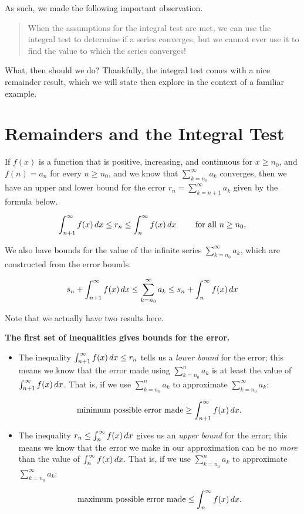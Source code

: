 \documentclass{ximera}
\begin{document}
As such, we made the following important observation. 
  
\begin{quote}
When the assumptions for the integral test are met, we can use the integral test to determine if a series converges, but we cannot ever use it to find the value to which the series converges!
\end{quote}

What, then should we do?  Thankfully, the integral test comes with a nice remainder result, which we will state then explore in the context of a familiar example.



\section{Remainders and the Integral Test}

\begin{theorem}
If $f(x)$ is a function that is positive, increasing, and continuous for $x \geq n_0$,  and $f(n) = a_n$ for every $n \geq n_0$, and we know that $\sum_{k=n_0}^\infty a_k$ converges, then we have an upper and lower bound for the error $r_n=\sum_{k=n+1}^{\infty} a_k$ given by the formula below.

\[
\int_{n+1}^{\infty} f(x) \mathop{}\!d x \leq  r_n \leq \int_{n}^{\infty} f(x) \mathop{}\!d x \qquad \textrm{ for all } n \geq n_0,
\]

We also have bounds for the value of the infinite series $\sum_{k=n_0}^\infty a_k$, which are constructed from the error bounds.

\[
s_n+ \int_{n+1}^{\infty} f(x) \mathop{}\!d x \leq  \sum_{k=n_0}^\infty a_k \leq s_n+ \int_{n}^{\infty} f(x) \mathop{}\!d x 
\]

\end{theorem}

Note that we actually have two results here.

\textbf{The first set of inequalities gives bounds for the error.}
\begin{itemize}
\item The inequality $\int_{n+1}^{\infty} f(x) \mathop{}\!d x \leq  r_n$ tells us a \emph{lower bound} for the error; this means we know that the error made using $\sum_{k=n_0}^n a_k$ is at least the value of $\int_{n+1}^{\infty} f(x) \mathop{}\!d x$.  That is, if we use $\sum_{k=n_0}^n a_k$ to approximate $\sum_{k=n_0}^\infty a_k$:

\[
\textrm{minimum possible error made}  \geq \int_{n+1}^{\infty} f(x) \mathop{}\!d x.
\]

\item The inequality $r_n \leq \int_{n}^{\infty} f(x) \mathop{}\!d x$ gives us an \emph{upper bound} for the error; this means we know that the error we make in our approximation can be no \emph{more} than the value of $\int_{n}^{\infty} f(x) \mathop{}\!d x$. That is, if we use $\sum_{k=n_0}^n a_k$ to approximate $\sum_{k=n_0}^\infty a_k$:

\[
\textrm{maximum possible error made}  \leq \int_{n}^{\infty} f(x) \mathop{}\!d x.
\]
\end{itemize}
\end{document}
